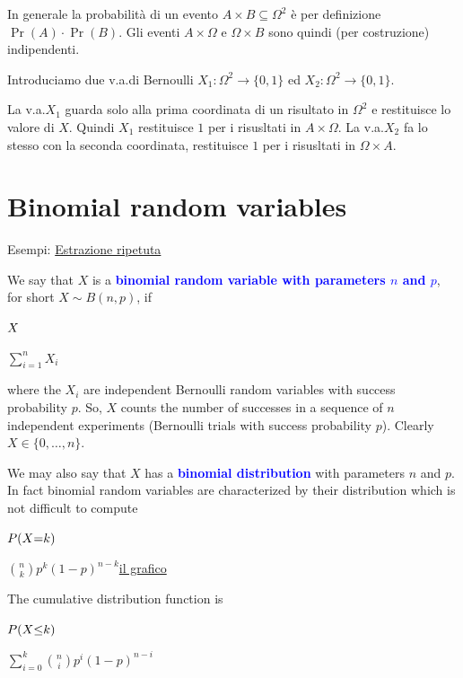 \documentclass[12pt,openany]{book}
\def\emph#1{\textcolor{blue}{\textbf{\boldmath #1}}}
\theoremstyle{mio}
\theoremstyle{liscio}
\begin{document}
In generale la probabilità di un evento $A\times B\subseteq\Omega^2$ è per definizione $\Pr(A)\cdot \Pr(B)$. Gli eventi $A\times\Omega$ e $\Omega\times B$ sono quindi (per costruzione) indipendenti.

Introduciamo due v.a.\@ di Bernoulli $X_1:\Omega^2\to\{0,1\}$ ed $X_2:\Omega^2\to\{0,1\}$.  

La v.a.\@ $X_1$ guarda solo alla prima coordinata di un risultato in $\Omega^2$ e restituisce lo valore di $X$. Quindi $X_1$ restituisce $1$ per i risusltati in $A\times\Omega$. La v.a.\@ $X_2$ fa lo stesso con la seconda coordinata,  restituisce $1$ per i risusltati in $\Omega\times A$.





\hfill{}\clearpage\section{Binomial random variables}
\label{Binomial_rv}

\def\ceq#1#2#3{\parbox{18ex}{$\displaystyle #1$}\medrel{#2}$\displaystyle  #3$}

{\color{brown}Esempi: \hyperref[estrazione_biglie_ripetuta]{Estrazione ripetuta \faShare}}

We say that $X$ is a \emph{binomial random variable with parameters $n$ and $p$}, for short $X\sim B(n,p)$, if

\ceq{\hfill X}{=}{\sum^n_{i=1}X_i}

where the $X_i$ are independent Bernoulli random variables with success probability $p$. So, $X$ counts the number of successes in a sequence of $n$ independent experiments (Bernoulli trials with success probability $p$). Clearly $X\in\{0,\dots,n\}$.

We may also say that $X$ has a \emph{binomial distribution\/} with parameters $n$ and $p$. In fact binomial random variables are characterized by their distribution which is not difficult to compute

\ceq{\hfill P(X{=}k)}{=}{{n\choose k}p^k(1-p)^{n-k}}\hfill \href{http://homepage.divms.uiowa.edu/~mbognar/applets/bin.html}{il grafico \faShare}

The cumulative distribution function is

\ceq{\hfill P(X{\le}k)}{=}{\sum^k_{i=0}{n\choose i}p^i(1-p)^{n-i}}
\end{document}
